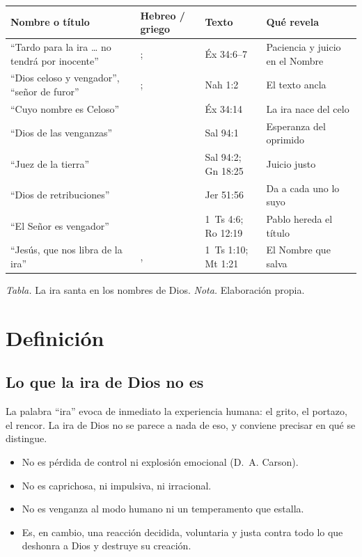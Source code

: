 \begin{center}
\small\renewcommand{\arraystretch}{1.2}
\begin{tabular}{@{}L{4.2cm}L{3.6cm}L{3.0cm}L{4.6cm}@{}}
\toprule
\textbf{Nombre o título} & \textbf{Hebreo / griego} & \textbf{Texto} & \textbf{Qué revela} \\ \midrule
``Tardo para la ira \ldots{} no tendrá por inocente'' & ;  & Éx 34:6--7 & Paciencia y juicio en el Nombre \\
``Dios celoso y vengador'', ``señor de furor'' & ;  & Nah 1:2 & El texto ancla \\
``Cuyo nombre es Celoso'' &  & Éx 34:14 & La ira nace del celo \\
``Dios de las venganzas'' &  & Sal 94:1 & Esperanza del oprimido \\
``Juez de la tierra'' &  & Sal 94:2; Gn 18:25 & Juicio justo \\
``Dios de retribuciones'' &  & Jer 51:56 & Da a cada uno lo suyo \\
``El Señor es vengador'' &  & 1~Ts 4:6; Ro 12:19 & Pablo hereda el título \\
``Jesús, que nos libra de la ira'' & ,  & 1~Ts 1:10; Mt 1:21 & El Nombre que salva \\ \bottomrule
\end{tabular}\par\smallskip
{\footnotesize\color{gris}\textit{Tabla.} La ira santa en los nombres de Dios. \textit{Nota.} Elaboración propia.}
\end{center}

\section{Definición}

\subsection{Lo que la ira de Dios no es}
La palabra ``ira'' evoca de inmediato la experiencia humana: el grito, el portazo, el rencor. La ira de Dios no se parece a nada de eso, y conviene precisar en qué se distingue.
\begin{itemize}
\item No es pérdida de control ni explosión emocional (D.~A. Carson).
\item No es caprichosa, ni impulsiva, ni irracional.
\item No es venganza al modo humano ni un temperamento que estalla.
\item Es, en cambio, una reacción decidida, voluntaria y justa contra todo lo que deshonra a Dios y destruye su creación.
\end{itemize}

